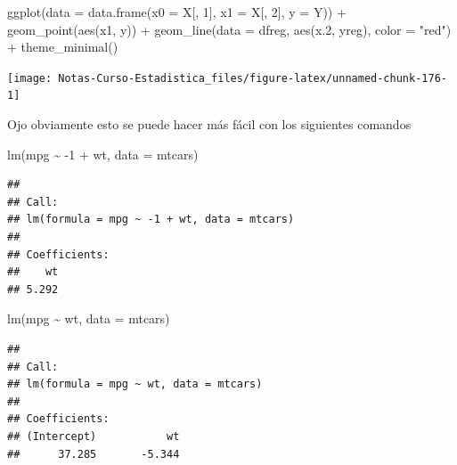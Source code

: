 \documentclass[
  12pt,
]{book}
\newenvironment{Shaded}{\begin{snugshade}}{\end{snugshade}}
\newcommand{\AttributeTok}[1]{\textcolor[rgb]{0.77,0.63,0.00}{#1}}
\newcommand{\DecValTok}[1]{\textcolor[rgb]{0.00,0.00,0.81}{#1}}
\newcommand{\FloatTok}[1]{\textcolor[rgb]{0.00,0.00,0.81}{#1}}
\newcommand{\FunctionTok}[1]{\textcolor[rgb]{0.00,0.00,0.00}{#1}}
\newcommand{\NormalTok}[1]{#1}
\newcommand{\SpecialCharTok}[1]{\textcolor[rgb]{0.00,0.00,0.00}{#1}}
\newcommand{\StringTok}[1]{\textcolor[rgb]{0.31,0.60,0.02}{#1}}
\theoremstyle{definition}
\theoremstyle{definition}
\theoremstyle{definition}
\theoremstyle{remark}
\begin{document}
\begin{Shaded}
\begin{Highlighting}[]
\FunctionTok{ggplot}\NormalTok{(}\AttributeTok{data =} \FunctionTok{data.frame}\NormalTok{(}\AttributeTok{x0 =}\NormalTok{ X[, }\DecValTok{1}\NormalTok{], }\AttributeTok{x1 =}\NormalTok{ X[, }\DecValTok{2}\NormalTok{], }
    \AttributeTok{y =}\NormalTok{ Y)) }\SpecialCharTok{+} \FunctionTok{geom\_point}\NormalTok{(}\FunctionTok{aes}\NormalTok{(x1, y)) }\SpecialCharTok{+} \FunctionTok{geom\_line}\NormalTok{(}\AttributeTok{data =}\NormalTok{ dfreg, }
    \FunctionTok{aes}\NormalTok{(x}\FloatTok{.2}\NormalTok{, yreg), }\AttributeTok{color =} \StringTok{"red"}\NormalTok{) }\SpecialCharTok{+} \FunctionTok{theme\_minimal}\NormalTok{()}
\end{Highlighting}
\end{Shaded}

\begin{center}\texttt{[image: Notas-Curso-Estadistica\_files/figure-latex/unnamed-chunk-176-1]} \end{center}

Ojo obviamente esto se puede hacer más fácil con los siguientes comandos

\begin{Shaded}
\begin{Highlighting}[]
\FunctionTok{lm}\NormalTok{(mpg }\SpecialCharTok{\textasciitilde{}} \SpecialCharTok{{-}}\DecValTok{1} \SpecialCharTok{+}\NormalTok{ wt, }\AttributeTok{data =}\NormalTok{ mtcars)}
\end{Highlighting}
\end{Shaded}

\begin{verbatim}
## 
## Call:
## lm(formula = mpg ~ -1 + wt, data = mtcars)
## 
## Coefficients:
##    wt  
## 5.292
\end{verbatim}

\begin{Shaded}
\begin{Highlighting}[]
\FunctionTok{lm}\NormalTok{(mpg }\SpecialCharTok{\textasciitilde{}}\NormalTok{ wt, }\AttributeTok{data =}\NormalTok{ mtcars)}
\end{Highlighting}
\end{Shaded}

\begin{verbatim}
## 
## Call:
## lm(formula = mpg ~ wt, data = mtcars)
## 
## Coefficients:
## (Intercept)           wt  
##      37.285       -5.344
\end{verbatim}
\end{document}
